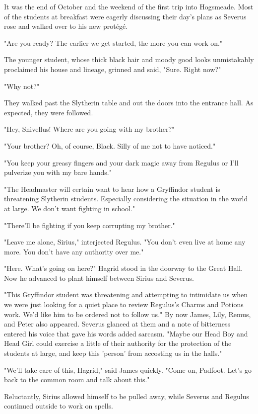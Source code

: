 \documentclass[a4paper,11pt]{article}
\begin{document}
It was the end of October and the weekend of the first trip into Hogsmeade. Most of the students at breakfast were eagerly discussing their day's plans as Severus rose and walked over to his new protégé.

"Are you ready? The earlier we get started, the more you can work on."

The younger student, whose thick black hair and moody good looks unmistakably proclaimed his house and lineage, grinned and said, "Sure. Right now?"

"Why not?"

They walked past the Slytherin table and out the doors into the entrance hall. As expected, they were followed.

"Hey, Snivellus! Where are you going with my brother?"

"Your brother? Oh, of course, Black. Silly of me not to have noticed."

"You keep your greasy fingers and your dark magic away from Regulus or I'll pulverize you with my bare hands."

"The Headmaster will certain want to hear how a Gryffindor student is threatening Slytherin students. Especially considering the situation in the world at large. We don't want fighting in school."

"There'll be fighting if you keep corrupting my brother."

"Leave me alone, Sirius," interjected Regulus. "You don't even live at home any more. You don't have any authority over me."

"Here. What's going on here?" Hagrid stood in the doorway to the Great Hall. Now he advanced to plant himself between Sirius and Severus.

"This Gryffindor student was threatening and attempting to intimidate us when we were just looking for a quiet place to review Regulus's Charms and Potions work. We'd like him to be ordered not to follow us." By now James, Lily, Remus, and Peter also appeared. Severus glanced at them and a note of bitterness entered his voice that gave his words added sarcasm. "Maybe our Head Boy and Head Girl could exercise a little of their authority for the protection of the students at large, and keep this 'person' from accosting us in the halls."

"We'll take care of this, Hagrid," said James quickly. "Come on, Padfoot. Let's go back to the common room and talk about this."

Reluctantly, Sirius allowed himself to be pulled away, while Severus and Regulus continued outside to work on spells.
\end{document}
